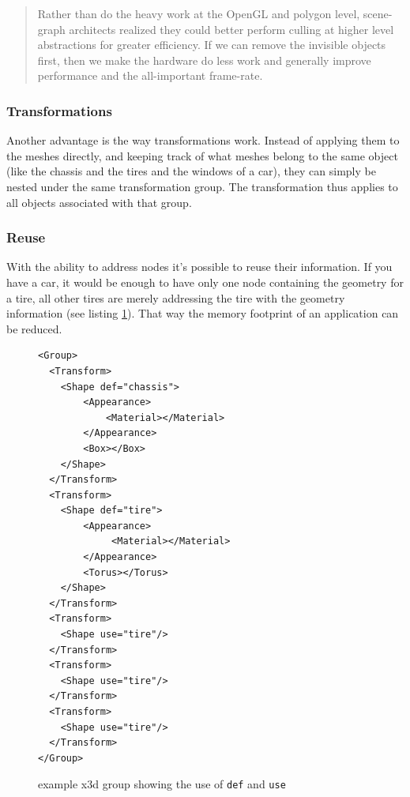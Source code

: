 \begin{quote}
  Rather than do the heavy work at the OpenGL and polygon level,
  scene-graph architects realized they could better perform culling at
  higher level abstractions for greater efficiency. If we can remove the
  invisible objects first, then we make the hardware do less work and
  generally improve performance and the all-important frame-rate. \cite{realityprime}
\end{quote}

\subsubsection{Transformations}\label{transformations}

Another advantage is the way transformations work. Instead of applying
them to the meshes directly, and keeping track of what meshes belong to
the same object (like the chassis and the tires and the windows of a
car), they can simply be nested under the same transformation group. The
transformation thus applies to all objects associated with that group.

\subsubsection{Reuse}\label{reuse}

With the ability to address nodes it's possible to reuse their
information. If you have a car, it would be enough to have only one node
containing the geometry for a tire, all other tires are merely addressing
the tire with the geometry information (see listing \ref{list:defuse}).
That way the memory footprint of an application can be reduced.

\begin{figure}
  \begin{verbatim}
<Group>
  <Transform>
    <Shape def="chassis">
        <Appearance>
            <Material></Material>
        </Appearance>
        <Box></Box>
    </Shape>
  </Transform>
  <Transform>
    <Shape def="tire">
        <Appearance>
             <Material></Material>
        </Appearance>
        <Torus></Torus>
    </Shape>
  </Transform>
  <Transform>
    <Shape use="tire"/>
  </Transform>
  <Transform>
    <Shape use="tire"/>
  </Transform>
  <Transform>
    <Shape use="tire"/>
  </Transform>
</Group>
  \end{verbatim}
  \caption{example x3d group showing the use of \texttt{def} and \texttt{use}}
  \label{list:defuse}
\end{figure}


